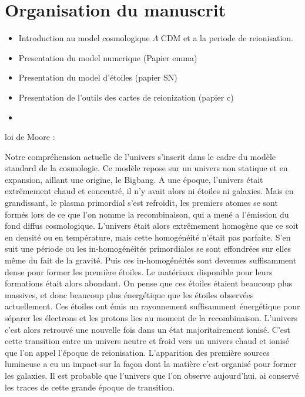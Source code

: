 \section{Organisation du manuscrit}
\begin{itemize}
\item Introduction au model cosmologique $\Lambda$ CDM et a la periode de reionisation.
\item Presentation du model numerique (Papier emma)
\item Presentation du model d'étoiles (papier SN)
\item Presentation de l'outils des cartes de reionization (papier c)
\item 
\end{itemize}

loi de Moore :\cite{THOMPSON200620}



Notre compréhension actuelle de l'univers s'inscrit dans le cadre du modèle standard de la cosmologie.
Ce modèle repose sur un univers non statique et en expansion, aillant une origine, le Bigbang.
A une époque, l'univers était extrêmement chaud et concentré, il n'y avait alors ni étoiles ni galaxies.
Mais en grandissant,  le plasma primordial s'est refroidit, les premiers atomes se sont formés lors de ce que l'on nomme la recombinaison, qui a mené a l'émission du fond diffus cosmologique.
L'univers était alors extrêmement homogène que ce soit en densité ou en température, mais cette homogénéité n'était pas parfaite.
S'en suit une période ou les in-homogénéités primordiales se sont effondrées sur elles même du fait de la gravité.
Puis ces in-homogénéités sont devenues suffisamment dense pour former les première étoiles.
Le matériaux disponible pour leurs formations était alors abondant.
On pense que ces étoiles étaient beaucoup plus massives, et donc beaucoup plus énergétique que les étoiles observées actuellement.
Ces étoiles ont émis un rayonnement suffisamment énergétique pour séparer les électrons et les protons lies au moment de la recombinaison.
L'univers c'est alors retrouvé une nouvelle fois dans un état majoritairement ionisé. 
C'est cette transition entre un univers neutre et froid vers un univers chaud et ionisé que l'on appel l'époque de reionisation.
L'apparition des première sources lumineuse a eu un impact sur la façon dont la matière c'est organisé pour former les galaxies.
Il est probable que l'univers que l'on observe aujourd'hui, ai conservé les traces de cette grande époque de transition.

